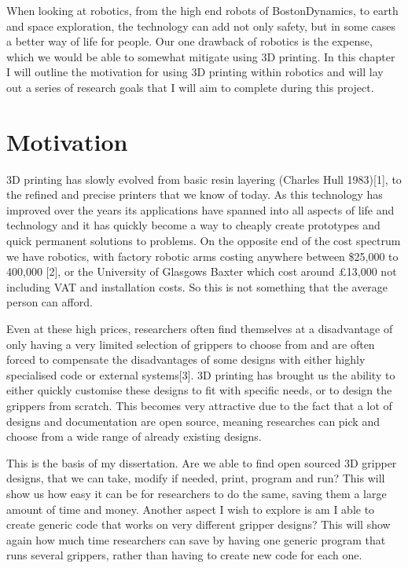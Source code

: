 \documentclass{l4proj}
\begin{document}
When looking at robotics, from the high end robots of BostonDynamics, to earth and space exploration, the technology can add not only safety, but in some cases a better way of life for people. Our one drawback of robotics is the expense, which we would be able to somewhat mitigate using 3D printing. In this chapter I will outline the motivation for using 3D printing within robotics and will lay out a series of research goals that I will aim to complete during this project. 


\section{Motivation}
3D printing has slowly evolved from basic resin layering (Charles Hull 1983)[1], to the refined and precise printers that we know of today. As this technology has improved over the years its applications have spanned into all aspects of life and technology and it has quickly become a way to cheaply create prototypes and quick permanent solutions to problems. On the opposite end of the cost spectrum we have robotics, with factory robotic arms costing anywhere between \$25,000 to 400,000 [2], or the University of Glasgows Baxter which cost around £13,000 not including VAT and installation costs. So this is not something that the average person can afford.

Even at these high prices, researchers often find themselves at a disadvantage of only having a very limited selection of grippers to choose from and are often forced to compensate the disadvantages of some designs with either highly specialised code or external systems[3]. 3D printing has brought us the ability to either quickly customise these designs to fit with specific needs, or to design the grippers from scratch. This becomes very attractive due to the fact that a lot of designs and documentation are open source, meaning researches can pick and choose from a wide range of already existing designs.  

This is the basis of my dissertation. Are we able to find open sourced 3D gripper designs, that we can take, modify if needed, print, program and run? This will show us how easy it can be for researchers to do the same, saving them a large amount of time and money. Another aspect I wish to explore is am I able to create generic code that works on very different gripper designs? This will show again how much time researchers can save by having one generic program that runs several grippers, rather than having to create new code for each one. 
\end{document}
